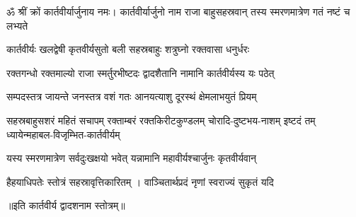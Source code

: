 

ॐ श्रीं क्रों कार्तवीर्यार्जुनाय नमः।
\twolineshloka
{कार्तवीर्यार्जुनो नाम राजा बाहुसहस्रवान्}
{तस्य स्मरणमात्रेण गतं नष्टं च लभ्यते}%

\twolineshloka
{कार्तवीर्यः खलद्वेषी कृतवीर्यसुतो बली}
{सहस्रबाहुः शत्रुघ्नो रक्तवासा धनुर्धरः}%

\twolineshloka
{रक्तगन्धो रक्तमाल्यो राजा स्मर्तुरभीष्टदः}
{द्वादशैतानि नामानि कार्तवीर्यस्य यः पठेत्}%

\twolineshloka
{सम्पदस्तत्र जायन्ते जनस्तत्र वशं गतः}
{आनयत्याशु दूरस्थं क्षेमलाभयुतं प्रियम्}%

\fourlineindentedshloka
{सहस्रबाहुसशरं महितं सचापम्}
{रक्ताम्बरं रक्तकिरीटकुण्डलम्}
{चोरादि-दुष्टभय-नाशम् इष्टदं तम्}
{ध्यायेन्महाबल-विजृम्भित-कार्तवीर्यम्}%

\twolineshloka
{यस्य स्मरणमात्रेण सर्वदुःखक्षयो भवेत्}
{यन्नामानि महावीर्यश्चार्जुनः कृतवीर्यवान्}%

\twolineshloka
{हैहयाधिपतेः स्तोत्रं सहस्रावृत्तिकारितम्} ।
{वाञ्चितार्थप्रदं नृणां स्वराज्यं सुकृतं यदि}%

॥इति कार्तवीर्य द्वादशनाम स्तोत्रम्॥